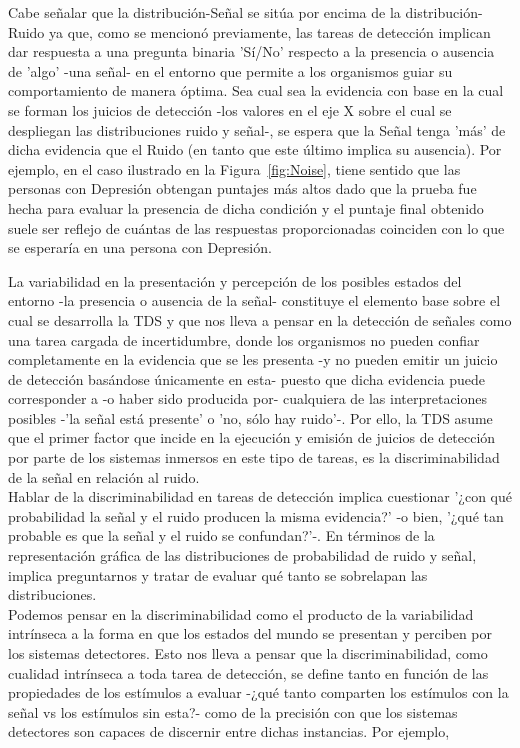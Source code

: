 \begin{itemize}
\begin{itemize}
Cabe señalar que la distribución-Señal se sitúa por encima de la distribución-Ruido ya que, como se mencionó previamente, las tareas de detección implican dar respuesta a una pregunta binaria 'Sí/No' respecto a la presencia o ausencia de 'algo' -una señal- en el entorno que permite a los organismos guiar su comportamiento de manera óptima. Sea cual sea la evidencia con base en la cual se forman los juicios de detección -los valores en el eje X sobre el cual se despliegan las distribuciones ruido y señal-, se espera que la Señal tenga 'más' de dicha evidencia que el Ruido (en tanto que este último implica su ausencia). Por ejemplo, en el caso ilustrado en la Figura~\ref{fig:Noise}, tiene sentido que las personas con Depresión obtengan puntajes más altos dado que la prueba fue hecha para evaluar la presencia de dicha condición y el puntaje final obtenido suele ser reflejo de cuántas de las respuestas proporcionadas coinciden con lo que se esperaría en una persona con Depresión.\\

     \end{itemize}

La variabilidad en la presentación y percepción de los posibles estados del entorno -la presencia o ausencia de la señal- constituye el elemento base sobre el cual se desarrolla la TDS y que nos lleva a pensar en la detección de señales como una tarea cargada de incertidumbre, donde los organismos no pueden confiar completamente en la evidencia que se les presenta -y no pueden emitir un juicio de detección basándose únicamente en esta- puesto que dicha evidencia puede corresponder a -o haber sido producida por- cualquiera de las interpretaciones posibles -'la señal está presente' o 'no, sólo hay ruido'-. Por ello, la TDS asume que el primer factor que incide en la ejecución y emisión de juicios de detección por parte de los sistemas inmersos en este tipo de tareas, es la discriminabilidad de la señal en relación al ruido.\\

Hablar de la discriminabilidad en tareas de detección implica cuestionar '¿con qué probabilidad la señal y el ruido producen la misma evidencia?' -o bien, '¿qué tan probable es que la señal y el ruido se confundan?'-. En términos de la representación gráfica de las distribuciones de probabilidad de ruido y señal, implica preguntarnos y tratar de evaluar qué tanto se sobrelapan las distribuciones.  \\

Podemos pensar en la discriminabilidad como el producto de la variabilidad intrínseca a la forma en que los estados del mundo se presentan y perciben por los sistemas detectores. Esto nos lleva a pensar que la discriminabilidad, como cualidad intrínseca a toda tarea de detección, se define tanto en función de las propiedades de los estímulos a evaluar -¿qué tanto comparten los estímulos con la señal vs los estímulos sin esta?- como de la precisión con que los sistemas detectores son capaces de discernir entre dichas instancias. Por ejemplo, \\


\end{itemize}

